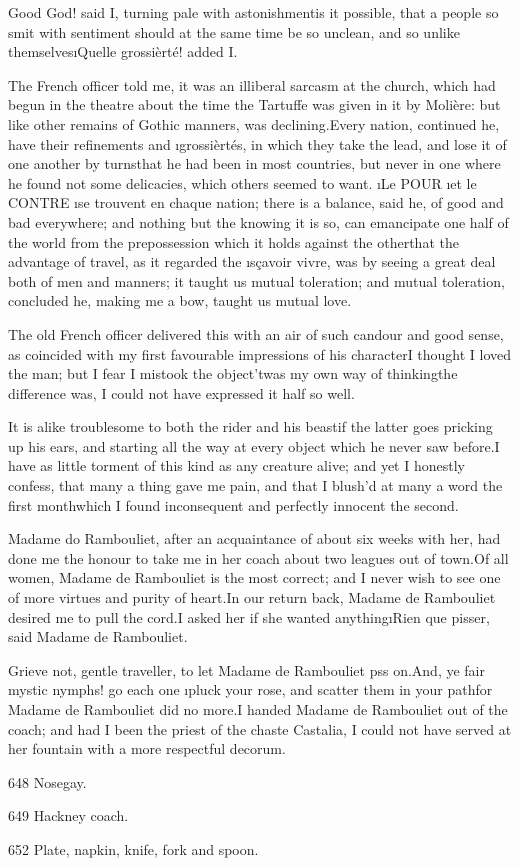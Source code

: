 \documentclass[twoside]{article}
\begin{document}
Good God! said I, turning pale with astonishment\tsk is it possible, that a
people so smit with sentiment should at the same time be so unclean, and
so unlike themselves\tsk \i{Quelle grossièrté!} added I.

The French officer told me, it was an illiberal sarcasm at the church,
which had begun in the theatre about the time the Tartuffe was given in
it by Molière: but like other remains of Gothic manners, was
declining.\tsk Every nation, continued he, have their refinements and
\i{grossièrtés}, in which they take the lead, and lose it of one another by
turns\tsk that he had been in most countries, but never in one where he
found not some delicacies, which others seemed to want.  \i{Le} POUR \i{et
le} CONTRE \i{se trouvent en chaque nation}; there is a balance, said he,
of good and bad everywhere; and nothing but the knowing it is so, can
emancipate one half of the world from the prepossession which it holds
against the other\tsk that the advantage of travel, as it regarded the
\i{sçavoir vivre}, was by seeing a great deal both of men and manners; it
taught us mutual toleration; and mutual toleration, concluded he, making
me a bow, taught us mutual love.

The old French officer delivered this with an air of such candour and
good sense, as coincided with my first favourable impressions of his
character\tsk I thought I loved the man; but I fear I mistook the
object\tsk ’twas my own way of thinking\tsk the difference was, I could not have
expressed it half so well.

It is alike troublesome to both the rider and his beast\tsk if the latter
goes pricking up his ears, and starting all the way at every object which
he never saw before.\tsk I have as little torment of this kind as any
creature alive; and yet I honestly confess, that many a thing gave me
pain, and that I blush’d at many a word the first month\tsk which I found
inconsequent and perfectly innocent the second.

Madame do Rambouliet, after an acquaintance of about six weeks with her,
had done me the honour to take me in her coach about two leagues out of
town.\tsk Of all women, Madame de Rambouliet is the most correct; and I never
wish to see one of more virtues and purity of heart.\tsk In our return back,
Madame de Rambouliet desired me to pull the cord.\tsk I asked her if she
wanted anything\tsk \i{Rien que pisser}, said Madame de Rambouliet.

Grieve not, gentle traveller, to let Madame de Rambouliet p\tsk ss on.\tsk And,
ye fair mystic nymphs! go each one \i{pluck your rose}, and scatter them in
your path\tsk for Madame de Rambouliet did no more.\tsk I handed Madame de
Rambouliet out of the coach; and had I been the priest of the chaste
Castalia, I could not have served at her fountain with a more respectful
decorum.











{648}  Nosegay.

{649}  Hackney coach.

{652}  Plate, napkin, knife, fork and spoon.
\end{document}
